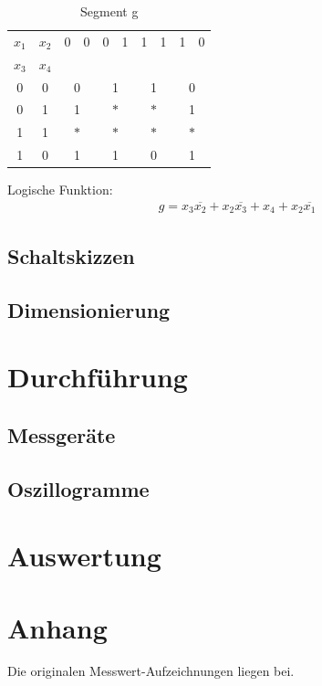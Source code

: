 \documentclass[numbers=noenddot,12pt,a4paper]{scrartcl}
\newcommand{\nicht}[1]{\overline{#1}}
\begin{document}
\begin{table}[H]
\centering
\begin{tabular}{cc||cc|cc|cc|cc}
$x_1$ & $x_2$ & 0 & 0 & 0 & 1 & 1 & 1 & 1 & 0 \\ \cline{0-1} 
$x_3$ & $x_4$ & & & & & & & & \\ \cline{1-10}
0 & 0 & \multicolumn{2}{|c|}{0} & \multicolumn{2}{|c|}{1} & \multicolumn{2}{|c|}{1} & \multicolumn{2}{|c}{0} \\
0 & 1 & \multicolumn{2}{|c|}{1} & \multicolumn{2}{|c|}{$\ast$} & \multicolumn{2}{|c|}{$\ast$} & \multicolumn{2}{|c}{1} \\ 
1 & 1 & \multicolumn{2}{|c|}{$\ast$} & \multicolumn{2}{|c|}{$\ast$} & \multicolumn{2}{|c|}{$\ast$} & \multicolumn{2}{|c}{$\ast$} \\ 
1 & 0 & \multicolumn{2}{|c|}{1} & \multicolumn{2}{|c|}{1} & \multicolumn{2}{|c|}{0} & \multicolumn{2}{|c}{1} \\ 
\end{tabular}
\caption{Segment g}
\end{table}
Logische Funktion:
\begin{align}
g=  x_3 \nicht{x_2}+ x_2 \nicht{x_3} + x_4 + x_2\nicht{x_1}
\end{align}

\subsection{Schaltskizzen}
\subsection{Dimensionierung}
\section{Durchführung}
\subsection{Messgeräte}
\subsection{Oszillogramme}
\section{Auswertung}
\section{Anhang}
Die originalen Messwert-Aufzeichnungen liegen bei.
\end{document}
